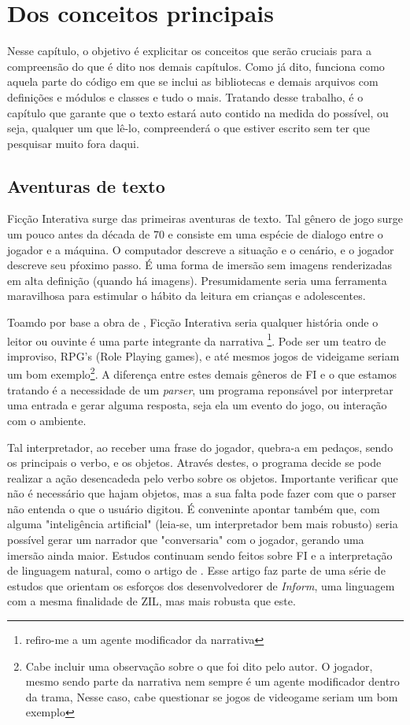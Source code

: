 \chapter{Dos conceitos principais}
\label{cap:main-concepts}

Nesse capítulo, o objetivo é explicitar os conceitos que serão cruciais para a
compreensão do que é dito nos demais capítulos. Como já dito, funciona como
aquela parte do código em que se inclui as bibliotecas e demais arquivos com
definições e módulos e classes e tudo o mais. Tratando desse trabalho, é o
capítulo que garante que o texto estará auto contido na medida do possível, ou
seja, qualquer um que lê-lo, compreenderá o que estiver escrito sem ter que
pesquisar muito fora daqui.

\section{Aventuras de texto}
\label{sec:text-adventure}

Ficção Interativa surge \citep{IF2} das primeiras aventuras de texto. Tal gênero
de jogo surge um pouco antes da década de 70 e consiste em uma espécie de dialogo
entre o jogador e a máquina. O computador descreve a situação e o cenário, e o
jogador descreve seu pŕoximo passo. É uma forma de imersão sem imagens
renderizadas em alta definição (quando há imagens). Presumidamente seria uma
ferramenta maravilhosa para estimular o hábito da leitura em crianças e
adolescentes.

Toamdo por base a obra de \citep{Jim:06}, Ficção Interativa seria qualquer
história onde o leitor ou ouvinte é uma parte integrante da narrativa
\footnote{refiro-me a um agente modificador da narrativa}. Pode ser um teatro de
improviso, RPG's (Role Playing games), e até mesmos jogos de videigame seriam um
bom exemplo\footnote{Cabe incluir uma observação sobre o que foi dito pelo autor.
O jogador, mesmo sendo parte da narrativa nem sempre é um agente modificador
dentro da trama, Nesse caso, cabe questionar se jogos de videogame seriam um bom
exemplo}. A diferença entre estes demais gêneros de FI e o que estamos tratando é
a necessidade de um \emph{parser}, um programa reponsável por interpretar uma
entrada e gerar alguma resposta, seja ela um evento do jogo, ou interação com o
ambiente.

Tal interpretador, ao receber uma frase do jogador, quebra-a em pedaços, sendo
os principais o verbo, e os objetos. Através destes, o programa decide se pode
realizar a ação desencadeda pelo verbo sobre os objetos. Importante verificar
que não é necessário que hajam objetos, mas a sua falta pode fazer com que o
parser não entenda o que o usuário digitou. É conveninte apontar também que, com
alguma "inteligência artificial" (leia-se, um interpretador bem mais robusto)
seria possível gerar um narrador que "conversaria" com o jogador, gerando uma
imersão ainda maior. Estudos continuam sendo feitos sobre FI e a interpretação
de linguagem natural, como o artigo de \citep{Nel:06}. Esse artigo faz parte de
uma série de estudos que orientam os esforços dos desenvolvedorer de
\emph{Inform}, uma linguagem com a mesma finalidade de ZIL, mas mais robusta
que este.

